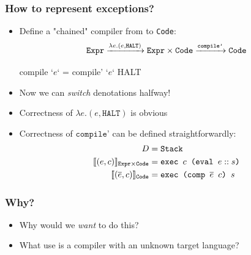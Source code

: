 \documentclass[usenames,dvipsnames]{beamer}
\newcommand{\denot}[2][]{\llbracket #2 \rrbracket_{#1}}
\begin{document}

\begin{frame}[fragile]
  \frametitle{How to represent exceptions?}

  \begin{itemize}
    \item Define a "chained" compiler from \Expr{} to \texttt{Code}:
      \begin{equation*}
        \texttt{Expr}
          \xrightarrow{\lambda e . (e , \texttt{HALT})}
        \texttt{Expr} \times \texttt{Code}
          \xrightarrow{\texttt{compile'}}
        \texttt{Code}
      \end{equation*}
      \begin{code}
                  compile `$e$` = compile' `$e$` HALT
      \end{code}

    \item Now we can \emph{switch} denotations halfway!

    \item Correctness of $\lambda e . (e , \texttt{HALT})$ is obvious

    \item Correctness of $\texttt{compile'}$ can be defined straightforwardly:
      \begin{align*}
        D &= \texttt{Stack} \\
        \denot[\Expr \times \texttt{Code}]{(e,c)} &=
          \texttt{exec }c\texttt{ (eval $e :: s$)} \\
        \denot[\texttt{Code}]{(\overline{e},c)} &=
          \texttt{exec (comp $\overline{e}$ $c$) $s$}
      \end{align*}
  \end{itemize}
\end{frame}


\begin{frame}[fragile]
  \frametitle{Why?}

  \begin{itemize}
    \item Why would we \emph{want} to do this?

    \item What use is a compiler with an unknown target language?
  \end{itemize}
\end{frame}

\end{document}
